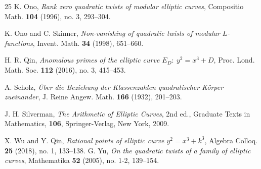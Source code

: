 \documentclass[12pt, 14paper,reqno]{amsart}
\theoremstyle{plain}
\theoremstyle{proof}
\numberwithin{equation}{section}
\begin{document}
\begin{thebibliography}{25}
 K. Ono, {\it Rank zero quadratic twists of modular elliptic curves}, Compositio Math. {\bf 104} (1996), no. 3, 293--304. 

 K. Ono and C. Skinner, {\it Non-vanishing of quadratic twists of modular $L$-functions}, Invent. Math. {\bf 34} (1998), 651--660.

 H. R. Qin, {\it Anomalous primes of the elliptic curve $E_D:~ y^2=x^3+D$}, Proc. Lond. Math. Soc. {\bf 112} (2016), no. 3, 415--453.

 A. Scholz, {\it \"{U}ber die Beziehung der Klassenzahlen quadratischer K\"{o}rper zueinander}, J. Reine Angew. Math. {\bf 166} (1932), 201--203.

 J. H. Silverman, {\it The Arithmetic of Elliptic Curves}, 2nd ed., Graduate Texts in Mathematics, {\bf 106}, Springer-Verlag, New York, 2009.


 X. Wu and Y. Qin, {\it Rational points of elliptic curve $y^2=x^3+k^3$},   Algebra Colloq. {\bf 25} (2018), no. 1, 133--138. 
 G. Yu, {\it On the quadratic twists of a family of elliptic curves},  Mathematika {\bf 52} (2005), no. 1-2, 139--154.

\end{thebibliography}
\end{document}

